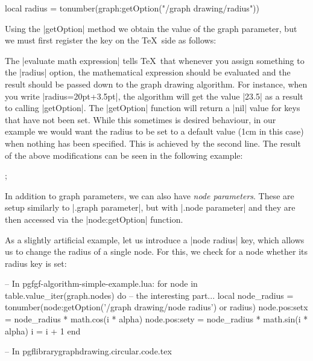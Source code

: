 \begin{codeexample}
local radius = tonumber(graph:getOption("/graph drawing/radius"))
\end{codeexample}

Using the |getOption| method we obtain the value of the
graph parameter, but we must first register the key on the \TeX\ side
as follows: 

\begin{codeexample}
\end{codeexample}

The |evaluate math expression| tells \TeX\ that whenever you assign
something to the |radius| option, the mathematical expression should
be evaluated and the result should be passed down to the graph drawing
algorithm. For instance, when you write |radius=20pt+3.5pt|, the
algorithm will get the value |23.5| as a result to calling
|getOption|. The |getOption| function will return a |nil| value for
keys that have not been set. While this sometimes is desired
behaviour, in our example we would want the radius to be set to a
default value (1cm in this case) when nothing has been specified. This
is achieved by the second line. The result of the above modifications
can be seen in the following example:

\begin{codeexample}[]
\tikz {};
\end{codeexample}


In addition to graph parameters, we can also have \emph{node
  parameters}. These are setup similarly to |.graph parameter|, but
with |.node parameter| and they are then accessed via the
|node:getOption| function.

As a slightly artificial example, let us introduce a |node radius|
key, which allows us to change the radius of a single node. For this,
we check for a node whether its radius key is set:

\begin{codeexample}
-- In pgfgf-algorithm-simple-example.lua:
   for node in table.value_iter(graph.nodes) do
      -- the interesting part...
      local node_radius = tonumber(node:getOption('/graph drawing/node radius')
                                   or radius)
      node.pos:set{x = node_radius * math.cos(i * alpha)}
      node.pos:set{y = node_radius * math.sin(i * alpha)}
      i = i + 1
   end
   
-- In pgflibrarygraphdrawing.circular.code.tex
\end{codeexample}

